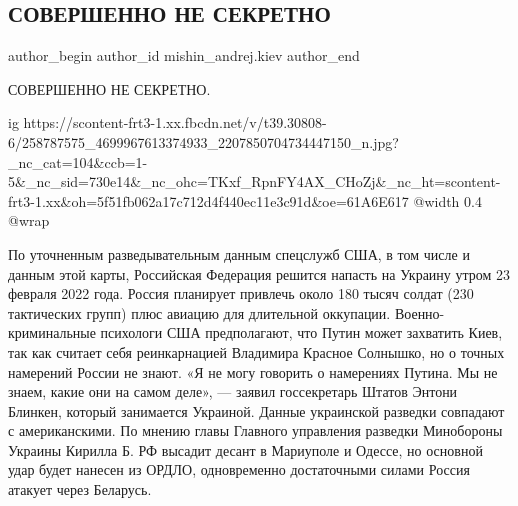  
 
 
 
 
 
\subsection{СОВЕРШЕННО НЕ СЕКРЕТНО}
\label{sec:22_11_2021.fb.mishin_andrej.kiev.1.ugroza_23_feb_2022}
 
\ifcmt
 author_begin
   author_id mishin_andrej.kiev
 author_end
\fi

СОВЕРШЕННО НЕ СЕКРЕТНО. 

\ifcmt
  ig https://scontent-frt3-1.xx.fbcdn.net/v/t39.30808-6/258787575_4699967613374933_2207850704734447150_n.jpg?_nc_cat=104&ccb=1-5&_nc_sid=730e14&_nc_ohc=TKxf_RpnFY4AX_CHoZj&_nc_ht=scontent-frt3-1.xx&oh=5f51fb062a17c712d4f440ec11e3c91d&oe=61A6E617
  @width 0.4
  @wrap 
\fi

По уточненным разведывательным данным спецслужб США, в том числе и данным этой
карты, Российская Федерация решится напасть на Украину утром 23 февраля 2022
года. Россия планирует привлечь около 180 тысяч солдат (230 тактических групп)
плюс авиацию для длительной оккупации.  Военно-криминальные психологи США
предполагают, что Путин может захватить Киев, так как считает себя
реинкарнацией Владимира Красное Солнышко, но о точных намерений России не
знают. «Я не могу говорить о намерениях Путина. Мы не знаем, какие они на самом
деле», — заявил госсекретарь Штатов Энтони Блинкен, который занимается
Украиной. Данные украинской разведки совпадают с американскими. По мнению главы
Главного управления разведки  Минобороны Украины Кирилла Б. РФ высадит десант в
Мариуполе и Одессе,  но основной удар будет нанесен из ОРДЛО, одновременно
достаточными силами  Россия атакует через Беларусь.

